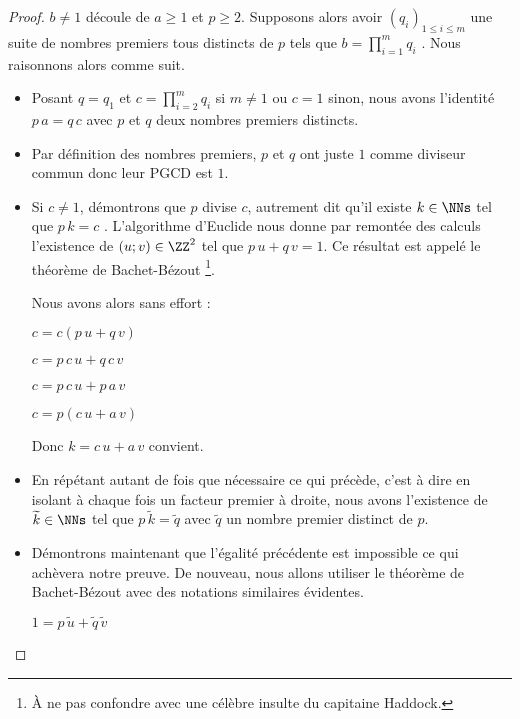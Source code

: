 \begin{proof}
	$b \neq 1$ découle de $a \geq 1$ et $p \geq 2$. 
	Supposons alors avoir $(q_i)_{1 \leq i \leq m}$ une suite de nombres premiers tous distincts de $p$ tels que $\displaystyle b = \prod_{i=1}^{m} q_i$ .
	Nous raisonnons alors comme suit.
	\begin{itemize}[label=\small\textbullet]
		\item Posant $q = q_1$ et $\displaystyle c = \prod_{i=2}^{m} q_i$ si $m \neq 1$ ou $c=1$ sinon, nous avons l'identité $p \, a = q \, c$ avec $p$ et $q$ deux nombres premiers distincts.
		
		
		\item Par définition des nombres premiers, $p$ et $q$ ont juste $1$ comme diviseur commun donc leur PGCD est $1$.

	
		\item Si $c \neq 1$, démontrons que $p$ divise $c$, autrement dit qu'il existe $k \in \NNs$ tel que $p \, k = c$ .
		L'algorithme d'Euclide nous donne par remontée des calculs l'existence de $(u ; v) \in \ZZ^2$ tel que $p \, u + q \, v = 1$. Ce résultat est appelé le théorème de Bachet-Bézout
		\footnote{
			À ne pas confondre avec une célèbre insulte du capitaine Haddock.
		}.
		
		\smallskip
		\noindent
		Nous avons alors sans effort :
		
		\smallskip
		\noindent
		$c = c(p \, u + q \, v)$
		
		\smallskip
		\noindent
		$c = p \, c \, u + q \, c \, v$
		
		\smallskip
		\noindent
		$c = p \, c \, u + p \, a \, v$
		
		\smallskip
		\noindent
		$c = p(c \, u + a \, v)$
		
		\smallskip
		\noindent
		Donc $k = c \, u + a \, v$ convient.
		
		
		\item En répétant autant de fois que nécessaire ce qui précède, c'est à dire en isolant à chaque fois un facteur premier à droite, nous avons l'existence de $\widetilde{k} \in \NNs$ tel que $p \, \widetilde{k} = \widetilde{q}$ avec $\widetilde{q}$ un nombre premier distinct de $p$.

	
		\item Démontrons maintenant que l'égalité précédente est impossible ce qui achèvera notre preuve. De nouveau, nous allons utiliser le théorème de Bachet-Bézout avec des notations similaires évidentes.
		
		\smallskip
		\noindent
		$1 = p \, \widetilde{u} + \widetilde{q} \, \widetilde{v}$
		

\end{itemize}
\end{proof}

